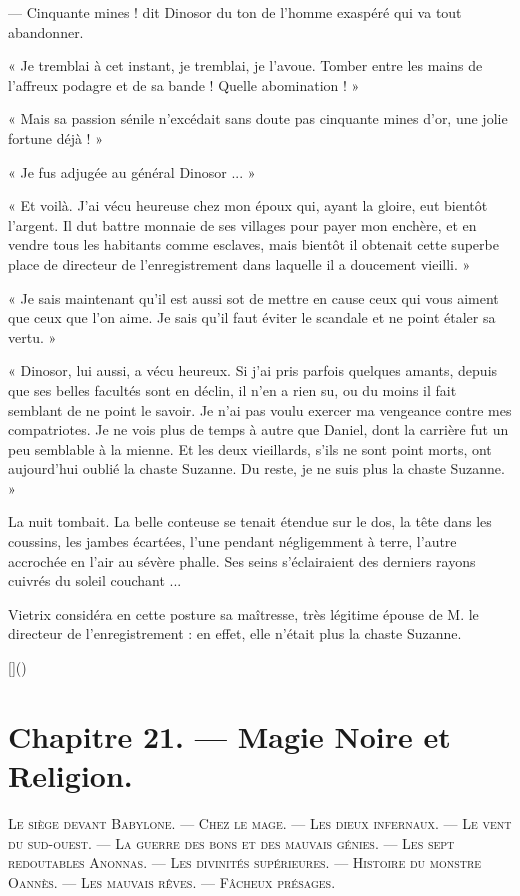 \documentclass[a4paper, 11pt, oneside, polutonikogreek, french]{article}
\begin{document}
--- Cinquante mines ! dit Dinosor du ton de l'homme exaspéré qui va tout abandonner.

« Je tremblai à cet instant, je tremblai, je l'avoue. Tomber entre les mains de l'affreux podagre et de sa bande ! Quelle abomination ! »

« Mais sa passion sénile n'excédait sans doute pas cinquante mines d'or, une jolie fortune déjà ! »

« Je fus adjugée au général Dinosor ... »

\bigskip
\centerline{\EightStarTaper}
\centerline{\EightStarTaper\EightStarTaper}
\bigskip

« Et voilà. J'ai vécu heureuse chez mon époux qui, ayant la gloire, eut bientôt l'argent. Il dut battre monnaie de ses villages pour payer mon enchère, et en vendre tous les habitants comme esclaves, mais bientôt il obtenait cette superbe place de directeur de l'enregistrement dans laquelle il a doucement vieilli. »

« Je sais maintenant qu'il est aussi sot de mettre en cause ceux qui vous aiment que ceux que l'on aime. Je sais qu'il faut éviter le scandale et ne point étaler sa vertu. »

« Dinosor, lui aussi, a vécu heureux. Si j'ai pris parfois quelques amants, depuis que ses belles facultés sont en déclin, il n'en a rien su, ou du moins il fait semblant de ne point le savoir. Je n'ai pas voulu exercer ma vengeance contre mes compatriotes. Je ne vois plus de temps à autre que Daniel, dont la carrière fut un peu semblable à la mienne. Et les deux vieillards, s'ils ne sont point morts, ont aujourd'hui oublié la chaste Suzanne. Du reste, je ne suis plus la chaste Suzanne. »

\bigskip
\centerline{\EightStarTaper}
\centerline{\EightStarTaper\EightStarTaper}
\bigskip

La nuit tombait. La belle conteuse se tenait étendue sur le dos, la tête dans les coussins, les jambes écartées, l'une pendant négligemment à terre, l'autre accrochée en l'air au sévère phalle. Ses seins s'éclairaient des derniers rayons cuivrés du soleil couchant ...

Vietrix considéra en cette posture sa maîtresse, très légitime épouse de M. le directeur de l'enregistrement : en effet, elle n'était plus la chaste Suzanne.

[]()
\clearpage
\section{Chapitre 21. --- Magie Noire et Religion.}
\begin{center}
\scshape
\small
Le siège devant Babylone. --- Chez le mage. --- Les dieux infernaux. --- Le vent du sud-ouest. --- La guerre des bons et des mauvais génies. --- Les sept redoutables Anonnas. --- Les divinités supérieures. --- Histoire du monstre Oannès. --- Les mauvais rêves. --- Fâcheux présages.
\end{center}
\end{document}
